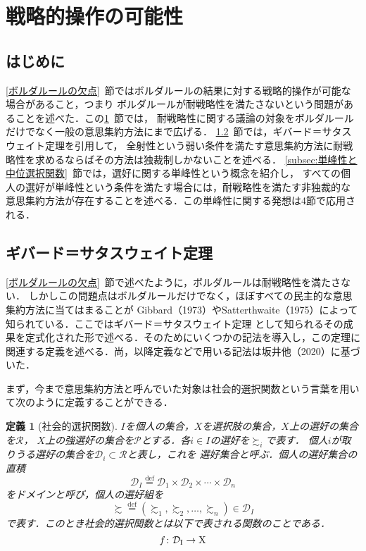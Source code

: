 \documentclass[dvipdfmx]{jsarticle}
\newtheorem{definition}{定義}[section]
\begin{document}
\section{戦略的操作の可能性}\label{sec:戦略的操作の可能性}
\subsection{はじめに}
\ref{ボルダルールの欠点}~節ではボルダルールの結果に対する戦略的操作が可能な場合があること，つまり
ボルダルールが耐戦略性を満たさないという問題があることを述べた．この\ref{sec:戦略的操作の可能性}~節では，
耐戦略性に関する議論の対象をボルダルールだけでなく一般の意思集約方法にまで広げる．
\ref{subsec:ギバード＝サタスウェイト定理}~節では，ギバード＝サタスウェイト定理を引用して，
全射性という弱い条件を満たす意思集約方法に耐戦略性を求めるならばその方法は独裁制しかないことを述べる．
\ref{subsec:単峰性と中位選択関数}~節では，選好に関する単峰性という概念を紹介し，
すべての個人の選好が単峰性という条件を満たす場合には，耐戦略性を満たす非独裁的な
意思集約方法が存在することを述べる．この単峰性に関する発想は4節で応用される．

\subsection{ギバード＝サタスウェイト定理}\label{subsec:ギバード＝サタスウェイト定理}
\ref{ボルダルールの欠点}~節で述べたように，ボルダルールは耐戦略性を満たさない．
しかしこの問題点はボルダルールだけでなく，ほぼすべての民主的な意思集約方法に当てはまることが
Gibbard（1973）やSatterthwaite（1975）によって知られている．ここではギバード＝サタスウェイト定理
として知られるその成果を定式化された形で述べる．そのためにいくつかの記法を導入し，この定理に
関連する定義を述べる．尚，以降定義などで用いる記法は坂井他（2020）に基づいた．

まず，今まで意思集約方法と呼んでいた対象は社会的選択関数という言葉を用いて次のように定義することができる．

\begin{definition}[社会的選択関数]
  $I$を個人の集合，$X$を選択肢の集合，$X$上の選好の集合を$\mathcal{R}$，
  $X$上の強選好の集合を$\mathcal{P}$とする．各$i \in I$の選好を$\succsim_i$で表す．
  個人$i$が取りうる選好の集合を$\mathcal{D}_i \subset \mathcal{R}$と表し，これを
  選好集合と呼ぶ．個人の選好集合の直積
  \[
    \mathcal{D}_I \stackrel{\mathrm{def}}{=} \mathcal{D}_1 \times
    \mathcal{D}_2 \times \cdots \times \mathcal{D}_n
  \]
  をドメインと呼び，個人の選好組を
  \[
    \succsim \stackrel{\mathrm{def}}{=} (\succsim_1, \succsim_2, \ldots, \succsim_n)
      \in \mathcal{D}_I
  \]
  で表す．このとき社会的選択関数とは以下で表される関数のことである．
  \[
    {\mathnormal{f}}\colon \mathcal{D}_{\mathrm{I}} \to \mathrm{X}
  \]
\end{definition}
\end{document}

